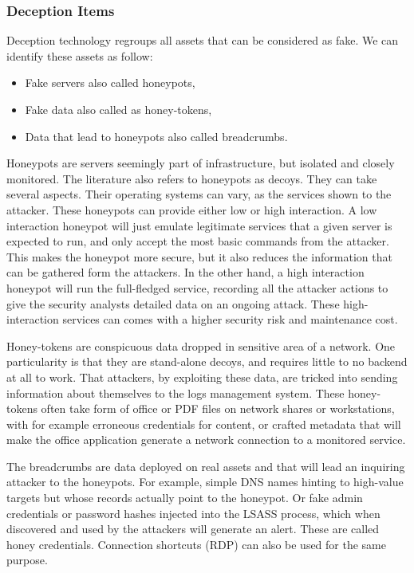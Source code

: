 \documentclass{tnreport}
\begin{document}
\subsubsection{Deception Items}
Deception technology regroups all assets that can be considered as fake. We can identify these assets as follow: 
\begin{itemize}
    \item Fake servers also called honeypots,
    \item Fake data also called as honey-tokens,
    \item Data that lead to honeypots also called breadcrumbs.
\end{itemize}
Honeypots are servers seemingly part of infrastructure, but isolated and closely monitored. The literature also refers to honeypots as decoys. They can take several aspects. Their operating systems can vary, as the services shown to the attacker. These honeypots can provide either low or high interaction. A low interaction honeypot will just emulate legitimate services that a given server is expected to run, and only accept the most basic commands from the attacker. This makes the honeypot more secure, but it also reduces the information that can be gathered form the attackers. In the other hand, a high interaction honeypot will run the full-fledged service, recording all the attacker actions to give the security analysts detailed data on an ongoing attack. These high-interaction services can comes with a higher security risk and maintenance cost.

Honey-tokens are conspicuous data dropped in sensitive area of a network. One particularity is that they are stand-alone decoys, and requires little to no backend at all to work. That attackers, by exploiting these data, are tricked into sending information about themselves to the logs management system. These honey-tokens often take form of office or PDF files on network shares or workstations, with for example erroneous credentials for content, or crafted metadata that will make the office application generate a network connection to a monitored service.

The breadcrumbs are data deployed on real assets and that will lead an inquiring attacker to the honeypots. For example, simple DNS names hinting to high-value targets but whose records actually point to the honeypot. Or fake admin credentials or password hashes injected into the LSASS process, which when discovered and used by the attackers will generate an alert. These are called honey credentials. Connection shortcuts (\gls{RDP}) can also be used for the same purpose.
\end{document}
